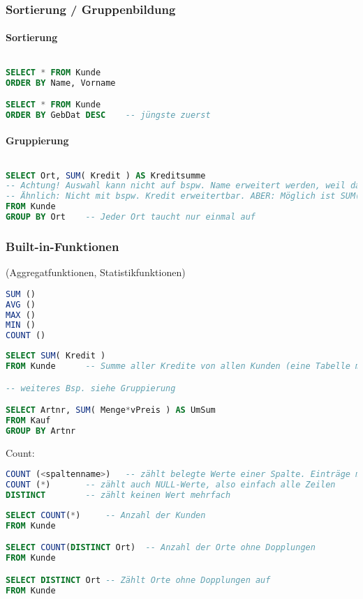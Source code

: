 \subsubsection{Sortierung / Gruppenbildung}
\paragraph{Sortierung} $ $
\begin{lstlisting}[language=SQL]
SELECT * FROM Kunde
ORDER BY Name, Vorname

SELECT * FROM Kunde
ORDER BY GebDat DESC	-- jüngste zuerst
\end{lstlisting}
\paragraph{Gruppierung} $ $
\begin{lstlisting}[language=SQL]
SELECT Ort, SUM( Kredit ) AS Kreditsumme
-- Achtung! Auswahl kann nicht auf bspw. Name erweitert werden, weil dann die Tabelle für einen Ort mehrere Namen hätte
-- Ähnlich: Nicht mit bspw. Kredit erweitertbar. ABER: Möglich ist SUM(Kredit), was dann alle Werte für den Ort aufsummieren würde
FROM Kunde
GROUP BY Ort	-- Jeder Ort taucht nur einmal auf
\end{lstlisting}

\subsubsection{Built-in-Funktionen}
(Aggregatfunktionen, Statistikfunktionen)
\begin{lstlisting}[language=SQL]
SUM ()
AVG ()
MAX ()
MIN ()
COUNT ()
\end{lstlisting}
\begin{lstlisting}[language=SQL]
SELECT SUM( Kredit ) 
FROM Kunde		-- Summe aller Kredite von allen Kunden (eine Tabelle mit nur einem Eintrag: der Summe)

-- weiteres Bsp. siehe Gruppierung

SELECT Artnr, SUM( Menge*vPreis ) AS UmSum
FROM Kauf
GROUP BY Artnr
\end{lstlisting}
Count:
\begin{lstlisting}[language=SQL]
COUNT (<spaltenname>)	-- zählt belegte Werte einer Spalte. Einträge mit NULL werden nicht gezählt.
COUNT (*)		-- zählt auch NULL-Werte, also einfach alle Zeilen
DISTINCT		-- zählt keinen Wert mehrfach
\end{lstlisting}
\begin{lstlisting}[language=SQL]
SELECT COUNT(*)		-- Anzahl der Kunden
FROM Kunde

SELECT COUNT(DISTINCT Ort)	-- Anzahl der Orte ohne Dopplungen
FROM Kunde

SELECT DISTINCT Ort	-- Zählt Orte ohne Dopplungen auf
FROM Kunde
\end{lstlisting}

